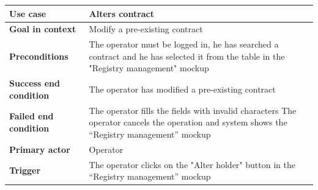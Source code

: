 {{{			\begin{center}
			\begin{tabular}{|p{4cm}|p{10cm}|}
			\hline
				\centering \vspace{1mm} \bfseries{Use case} \vspace{1mm} & 
				\vspace{1mm} Alters contract \vspace{1mm}\\
			\hline
				\centering \vspace{1mm} \bfseries{Goal in context} \vspace{1mm} & 
				\vspace{1mm} Modify a pre-existing contract \vspace{1mm}\\
			\hline
				\centering \vspace{1mm} \bfseries{Preconditions} \vspace{1mm} & 
				\vspace{1mm} The operator must be logged in, he has searched a contract and he has selected it from the table in the "Registry management"  mockup \vspace{1mm}\\
			\hline
				\centering \vspace{1mm} \bfseries{Success end condition} \vspace{1mm} & 
				\vspace{1mm} The operator has modified a pre-existing contract \vspace{1mm}\\
			\hline
				\centering \vspace{1mm} \bfseries{Failed end condition} \vspace{1mm} & 
				\vspace{1mm} The operator fills the fields with invalid characters The operator cancels the operation and system shows the “Registry management” mockup \vspace{1mm}\\
			\hline
				\centering \vspace{1mm} \bfseries{Primary actor} \vspace{1mm} & 
				\vspace{1mm} Operator \vspace{1mm}\\
			\hline
				\centering \vspace{1mm} \bfseries{Trigger} \vspace{1mm} & 
				\vspace{1mm} The operator clicks on the "Alter holder" button in the “Registry management” mockup \vspace{1mm}\\
			\hline
			\end{tabular}


\end{center}}}}
